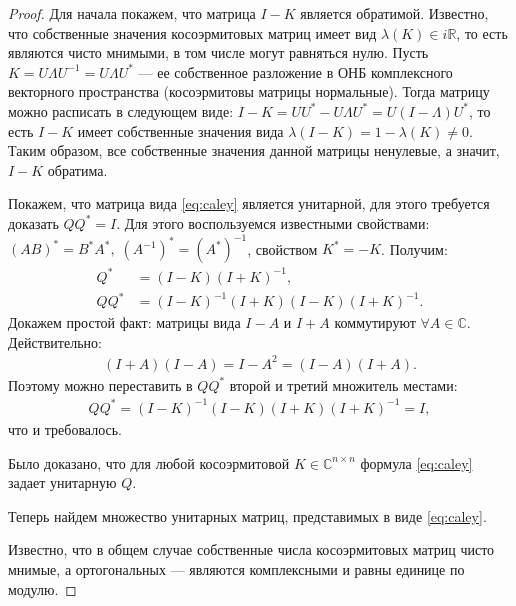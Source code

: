 \documentclass{article}
\newtheorem*{proof}{$\square$}
\newcommand{\R}{\mathbb{R}}
\renewcommand{\C}{\mathbb{C}}
\begin{document}
		\begin{proof}
		Для начала покажем, что матрица $I - K$ является обратимой. Известно, что собственные значения косоэрмитовых матриц имеет вид $\lambda(K) \in i\R$, то есть являются чисто мнимыми, в том числе могут равняться нулю. Пусть $K = U \Lambda U^{-1} = U \Lambda U^*$ --- ее собственное разложение в ОНБ комплексного векторного пространства (косоэрмитовы матрицы нормальные). Тогда матрицу можно расписать в следующем виде: $I - K = U U^* - U \Lambda U^* = U (I - \Lambda) U^*$, то есть $I - K$ имеет собственные значения вида $\lambda(I - K) = 1 - \lambda(K) \neq 0$. Таким образом, все собственные значения данной матрицы ненулевые, а значит, $I - K$ обратима.
		

		Покажем, что матрица вида \eqref{eq:caley} является унитарной, для этого требуется доказать $Q Q^* = I$. Для этого воспользуемся известными свойствами: $(AB)^*=B^*A^*,\; (A^{-1})^* = (A^*)^{-1}$, свойством $K^* = -K$. Получим:
		\begin{equation*}\begin{aligned}
		Q^* &= (I - K)(I + K)^{-1},\\
		Q Q^* &= (I - K)^{-1}(I + K)(I - K)(I + K)^{-1}.
		\end{aligned}\end{equation*}
		Докажем простой факт: матрицы вида $I - A$ и $I + A$ коммутируют $\forall A \in \C$. Действительно:
		\begin{equation*}\begin{aligned}
		(I + A)(I - A) = I - A^2 = (I - A)(I + A).
		\end{aligned}\end{equation*}
		Поэтому можно переставить в $Q Q^*$ второй и третий множитель местами:
		\begin{equation*}\begin{aligned}
		Q Q^* = (I - K)^{-1}(I - K)(I + K)(I + K)^{-1} = I, 
		\end{aligned}\end{equation*}
		что и требовалось.
		
		Было доказано, что для любой косоэрмитовой $K \in \C^{n\times n} $ формула \eqref{eq:caley} задает унитарную $Q$.
		
		Теперь найдем множество унитарных матриц, представимых в виде \eqref{eq:caley}.
		
		Известно, что в общем случае собственные числа косоэрмитовых матриц чисто мнимые, а ортогональных --- являются комплексными и равны единице по модулю.
		

\end{proof}
\end{document}
